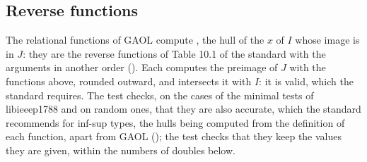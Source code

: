 \documentclass[12pt,a4paper,twoside,openright]{book}
\begin{document}
\subsection{Reverse functions}\label{sec:accuracy-reverse}
%

The relational functions of GAOL compute , the hull of
the $x$ of $I$ whose image is in $J$: they are the reverse functions of
Table 10.1 of the standard with the arguments in another order
(). Each computes the preimage of $J$
with the functions above, rounded outward, and intersects it with $I$: it
is valid, which the standard requires. The test 
checks, on the cases of the minimal tests of libieeep1788 and on random
ones, that they are also accurate, which the standard recommends for
inf-sup types, the hulls being computed from the definition of each
function, apart from GAOL (); the test
 checks that they keep the values they
are given, within the numbers of doubles below.
\end{document}
